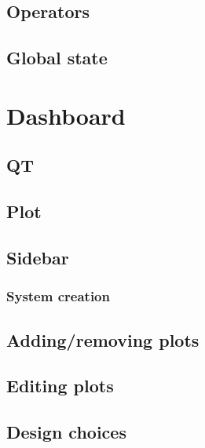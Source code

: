         \subsection{Operators}
        \subsection{Global state}

    \section{Dashboard}
        \subsection{QT}
        \subsection{Plot}
        \subsection{Sidebar}
            \subsubsection{System creation}
        \subsection{Adding/removing plots}
        \subsection{Editing plots}
        \subsection{Design choices}


